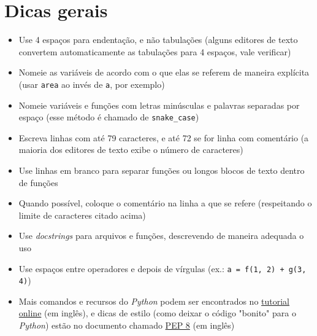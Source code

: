 \section{Dicas gerais}
\begin{itemize}
	\item Use 4 espaços para endentação, e não tabulações (alguns editores de texto convertem automaticamente as tabulações para 4 espaços, vale verificar)
	\item Nomeie as variáveis de acordo com o que elas se referem de maneira explícita (usar \verb|area| ao invés de \verb|a|, por exemplo)
	\item Nomeie variáveis e funções com letras minúsculas e palavras separadas por espaço (esse método é chamado de \verb|snake_case|)
	\item Escreva linhas com até 79 caracteres, e até 72 se for linha com comentário (a maioria dos editores de texto exibe o número de caracteres)
	\item Use linhas em branco para separar funções ou longos blocos de texto dentro de funções
	\item Quando possível, coloque o comentário na linha a que se refere (respeitando o limite de caracteres citado acima)
	\item Use \textit{docstrings} para arquivos e funções, descrevendo de maneira adequada o uso
	\item Use espaços entre operadores e depois de vírgulas (ex.: \verb|a = f(1, 2) + g(3, 4)|)
	\item Mais comandos e recursos do \textit{Python} podem ser encontrados no \href{https://docs.python.org/3/tutorial/index.html}{tutorial online} (em inglês), e dicas de estilo (como deixar o código "bonito" para o \textit{Python}) estão no documento chamado \href{https://www.python.org/dev/peps/pep-0008}{PEP 8} (em inglês)
\end{itemize}